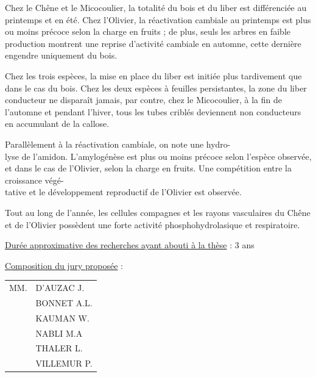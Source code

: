 Chez le Chêne et le Micocoulier, la totalité du bois et du liber est différenciée au printemps et en été. Chez l'Olivier, la réactivation cambiale au printemps est plus ou moins précoce selon la charge en fruits ; de plus, seuls les arbres en faible production montrent une reprise d'activité cambiale en automne, cette dernière engendre uniquement du bois.

Chez les trois espèces, la mise en place du liber est initiée plus tardivement que dans le cas du bois. Chez les deux espèces à feuilles persistantes, la zone du liber conducteur ne disparaît jamais, par contre, chez le Micocoulier, à la fin de l'automne et pendant l'hiver, tous les tubes criblés deviennent non conducteurs en accumulant de la callose.

Parallèlement à la réactivation cambiale, on note une hydro-\\
lyse de l'amidon. L'amylogénèse est plus ou moins précoce selon l'espèce observée, et dans le cas de l'Olivier, selon la charge en fruits. Une compétition entre la croissance végé-\\
tative et le développement reproductif de l'Olivier est observée.

Tout au long de l'année, les cellules compagnes et les rayons vasculaires du Chêne et de l'Olivier possèdent une forte activité phosphohydrolasique et respiratoire.

\uline{Durée approximative des recherches ayant abouti à la thèse} : 3 ans

\uline{Composition du jury proposée} :

\begin{tabular}{ll}
MM. & D'AUZAC J.\\
& BONNET A.L.\\
& KAUMAN W.\\
& NABLI M.A\\
& THALER L.\\
& VILLEMUR P.
\end{tabular}

